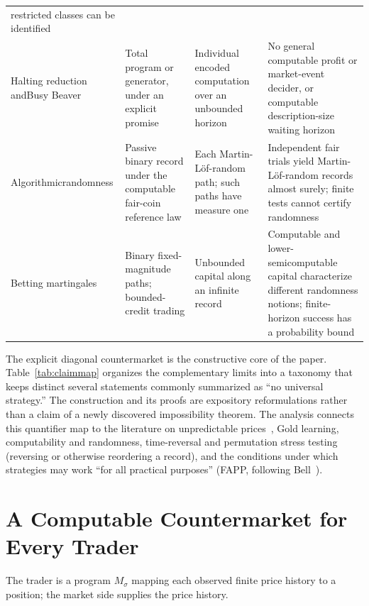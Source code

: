 \documentclass[aps,pra,reprint,superscriptaddress,amsmath,amssymb,floatfix]{revtex4-2}
\theoremstyle{plain}
\theoremstyle{definition}
\theoremstyle{remark}
\begin{document}
\begin{table}[t]
\begin{ruledtabular}
\begin{tabular}{p{}p{}p{}p{}}
restricted classes can be identified \\
Halting reduction and\newline Busy Beaver
& Total program or generator, under an explicit promise
& Individual encoded computation over an unbounded horizon
& No general computable profit or market-event decider, or computable
description-size waiting horizon \\
Algorithmic\newline randomness
& Passive binary record under the computable fair-coin reference law
& Each Martin-L\"of-random path; such paths have measure one
& Independent fair trials yield Martin-L\"of-random records almost surely;
finite tests cannot certify randomness \\
Betting martingales
& Binary fixed-magnitude paths; bounded-credit trading
& Unbounded capital along an infinite record
& Computable and lower-semicomputable capital characterize different
randomness notions; finite-horizon success has a probability bound \\
\end{tabular}
\end{ruledtabular}
\end{table}

The explicit diagonal countermarket is the constructive core of the paper.
Table~\ref{tab:claimmap} organizes the complementary limits into a taxonomy that
keeps distinct several statements commonly summarized as ``no universal
strategy.'' The construction and its proofs are expository reformulations
rather than a claim of a newly discovered impossibility theorem.
The analysis connects this quantifier map to the literature on unpredictable
prices~\cite{Bachelier1900,Samuelson1965,Fama1970}, Gold learning, computability
and randomness, time-reversal and permutation stress
testing (reversing or otherwise reordering a record), and the conditions under
which strategies may work ``for all practical purposes'' (FAPP, following
Bell~\cite{bell-a}).

\section{A Computable Countermarket for Every Trader}
\label{sec:countermarket}

The trader is a program \(M_\sigma\) mapping each observed finite price history
to a position; the market side supplies the price history.
\end{document}
